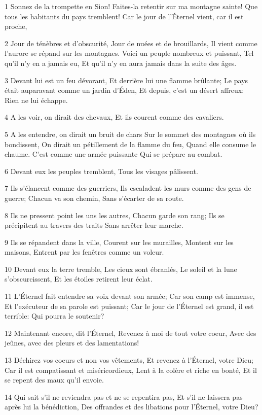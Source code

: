 \par 1 Sonnez de la trompette en Sion! Faites-la retentir sur ma montagne sainte! Que tous les habitants du pays tremblent! Car le jour de l'Éternel vient, car il est proche,
\par 2 Jour de ténèbres et d'obscurité, Jour de nuées et de brouillards, Il vient comme l'aurore se répand sur les montagnes. Voici un peuple nombreux et puissant, Tel qu'il n'y en a jamais eu, Et qu'il n'y en aura jamais dans la suite des âges.
\par 3 Devant lui est un feu dévorant, Et derrière lui une flamme brûlante; Le pays était auparavant comme un jardin d'Éden, Et depuis, c'est un désert affreux: Rien ne lui échappe.
\par 4 A les voir, on dirait des chevaux, Et ils courent comme des cavaliers.
\par 5 A les entendre, on dirait un bruit de chars Sur le sommet des montagnes où ils bondissent, On dirait un pétillement de la flamme du feu, Quand elle consume le chaume. C'est comme une armée puissante Qui se prépare au combat.
\par 6 Devant eux les peuples tremblent, Tous les visages pâlissent.
\par 7 Ils s'élancent comme des guerriers, Ils escaladent les murs comme des gens de guerre; Chacun va son chemin, Sans s'écarter de sa route.
\par 8 Ils ne pressent point les uns les autres, Chacun garde son rang; Ils se précipitent au travers des traits Sans arrêter leur marche.
\par 9 Ils se répandent dans la ville, Courent sur les murailles, Montent sur les maisons, Entrent par les fenêtres comme un voleur.
\par 10 Devant eux la terre tremble, Les cieux sont ébranlés, Le soleil et la lune s'obscurcissent, Et les étoiles retirent leur éclat.
\par 11 L'Éternel fait entendre sa voix devant son armée; Car son camp est immense, Et l'exécuteur de sa parole est puissant; Car le jour de l'Éternel est grand, il est terrible: Qui pourra le soutenir?
\par 12 Maintenant encore, dit l'Éternel, Revenez à moi de tout votre coeur, Avec des jeûnes, avec des pleurs et des lamentations!
\par 13 Déchirez vos coeurs et non vos vêtements, Et revenez à l'Éternel, votre Dieu; Car il est compatissant et miséricordieux, Lent à la colère et riche en bonté, Et il se repent des maux qu'il envoie.
\par 14 Qui sait s'il ne reviendra pas et ne se repentira pas, Et s'il ne laissera pas après lui la bénédiction, Des offrandes et des libations pour l'Éternel, votre Dieu?
